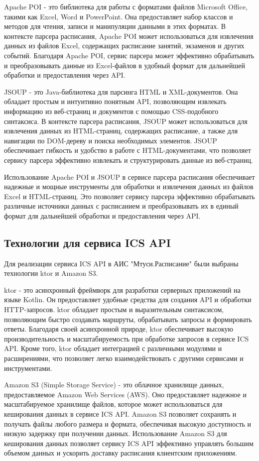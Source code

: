 Apache POI - это библиотека для работы с форматами файлов Microsoft Office, 
такими как Excel, Word и PowerPoint. Она предоставляет набор классов и методов для чтения, 
записи и манипуляции данными в этих форматах. В контексте парсера расписания, 
Apache POI может использоваться для извлечения данных из файлов Excel, 
содержащих расписание занятий, экзаменов и других событий. 
Благодаря Apache POI, сервис парсера может эффективно обрабатывать и преобразовывать 
данные из Excel-файлов в удобный формат для дальнейшей обработки и предоставления через API.

JSOUP - это Java-библиотека для парсинга HTML и XML-документов. 
Она обладает простым и интуитивно понятным API, позволяющим извлекать информацию из веб-страниц и документов 
с помощью CSS-подобного синтаксиса. В контексте парсера расписания, JSOUP может использоваться для извлечения данных из HTML-страниц, 
содержащих расписание, а также для навигации по DOM-дереву и поиска необходимых элементов. 
JSOUP обеспечивает гибкость и удобство в работе с HTML-документами, что 
позволяет сервису парсера эффективно извлекать и структурировать данные из веб-страниц.

Использование Apache POI и JSOUP в сервисе парсера расписания обеспечивает 
надежные и мощные инструменты для обработки и извлечения данных из файлов Excel и HTML-страниц. 
Это позволяет сервису парсера эффективно обрабатывать различные источники данных с расписанием и преобразовывать их 
в единый формат для дальнейшей обработки и предоставления через API.

\subsection{Технологии для сервиса ICS API}
Для реализации сервиса ICS API в АИС "Мтуси.Расписание" были выбраны технологии ktor и Amazon S3.

ktor - это асинхронный фреймворк для разработки серверных приложений на языке Kotlin. 
Он предоставляет удобные средства для создания API и обработки HTTP-запросов. 
ktor обладает простым и выразительным синтаксисом, позволяющим быстро создавать маршруты, 
обрабатывать запросы и формировать ответы. Благодаря своей асинхронной природе, 
ktor обеспечивает высокую производительность и масштабируемость при обработке запросов в сервисе ICS API. 
Кроме того, ktor обладает интеграцией с различными модулями и расширениями, что позволяет легко взаимодействовать 
с другими сервисами и инструментами.

Amazon S3 (Simple Storage Service) - это облачное хранилище данных, предоставляемое Amazon Web Services (AWS). 
Оно предоставляет надежное и масштабируемое хранилище файлов, которое может использоваться для кеширования данных в сервисе ICS API. 
Amazon S3 позволяет сохранять и получать файлы любого размера и формата, 
обеспечивая высокую доступность и низкую задержку при получении данных. 
Использование Amazon S3 для кеширования данных позволяет сервису ICS API эффективно управлять большим 
объемом данных и ускорить доставку расписания клиентским приложениям.

